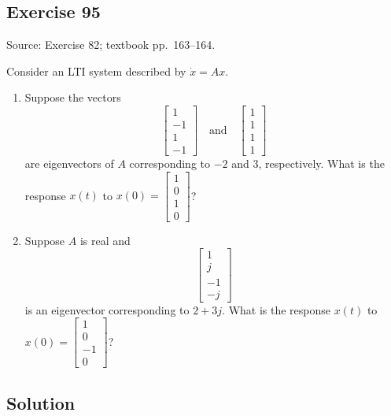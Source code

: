 \documentclass[12pt,a4paper]{article}
\newlength{\questionroom}
\newenvironment{questionprompt}{%
  \begin{lrbox}{\questionbox}\begin{minipage}{\linewidth}%
}{%
  \end{minipage}\end{lrbox}%
  \setlength{\questionroom}{\dimexpr\ht\questionbox+\dp\questionbox+5.2cm\relax}%
  \ifdim\questionroom>\textheight\setlength{\questionroom}{\textheight}\fi
  \Needspace{\questionroom}%
  \noindent\usebox{\questionbox}\par
}
\begin{document}
\begin{questionprompt}
\section*{Exercise 95}
\label{practice:95}
{\small Source: Exercise 82; textbook pp.~163--164.}\par
Consider an LTI system described by $\dot x=Ax$.
\begin{enumerate}[label=(\alph*)]
\item Suppose the vectors
\[\begin{bmatrix}1\\-1\\1\\-1\end{bmatrix}\quad\text{and}\quad\begin{bmatrix}1\\1\\1\\1\end{bmatrix}\]
are eigenvectors of $A$ corresponding to $-2$ and $3$, respectively. What is the response $x(t)$ to $x(0)=\begin{bmatrix}1\\0\\1\\0\end{bmatrix}$?
\item Suppose $A$ is real and
\[\begin{bmatrix}1\\j\\-1\\-j\end{bmatrix}\]
is an eigenvector corresponding to $2+3j$. What is the response $x(t)$ to $x(0)=\begin{bmatrix}1\\0\\-1\\0\end{bmatrix}$?
\end{enumerate}
\end{questionprompt}
\subsection*{Solution}
\vspace{3.5cm}
\end{document}
